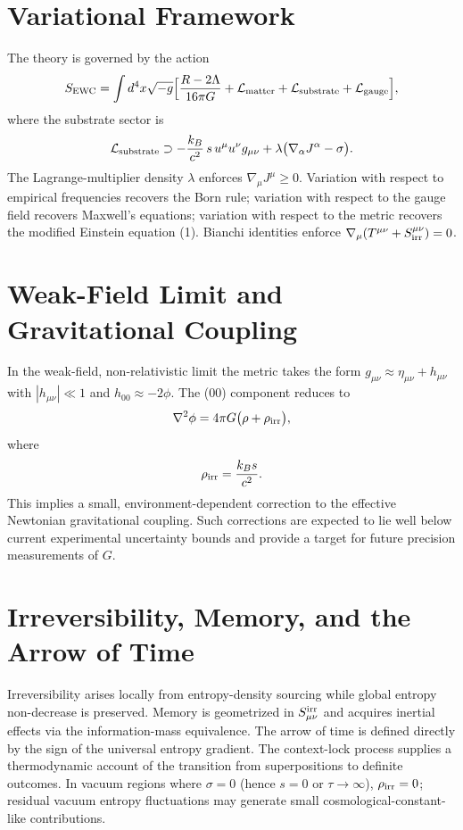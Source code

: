 \documentclass[11pt,letterpaper]{article}
\begin{document}
\section{Variational Framework}
The theory is governed by the action
\[
S_{\rm EWC} = \int d^4x \sqrt{-g} \Bigl[ \frac{R-2\Lambda}{16\pi G} + \mathcal{L}_{\rm matter} + \mathcal{L}_{\rm substrate} + \mathcal{L}_{\rm gauge} \Bigr],
\]
where the substrate sector is
\[
\mathcal{L}_{\rm substrate} \supset -\frac{k_B}{c^2} \, s \, u^\mu u^\nu g_{\mu\nu} + \lambda \bigl( \nabla_\alpha J^\alpha - \sigma \bigr).
\]
The Lagrange-multiplier density \(\lambda\) enforces \(\nabla_\mu J^\mu \geq 0\). Variation with respect to empirical frequencies recovers the Born rule; variation with respect to the gauge field recovers Maxwell’s equations; variation with respect to the metric recovers the modified Einstein equation (1). Bianchi identities enforce \(\nabla_\mu (T^{\mu\nu} + S_{\rm irr}^{\mu\nu}) = 0\).

\section{Weak-Field Limit and Gravitational Coupling}
In the weak-field, non-relativistic limit the metric takes the form \(g_{\mu\nu} \approx \eta_{\mu\nu} + h_{\mu\nu}\) with \(|h_{\mu\nu}| \ll 1\) and \(h_{00} \approx -2\phi\). The (00) component reduces to
\[
\nabla^2 \phi = 4\pi G \bigl( \rho + \rho_{\rm irr} \bigr),
\]
where
\[
\rho_{\rm irr} = \frac{k_B s}{c^2}.
\]
This implies a small, environment-dependent correction to the effective Newtonian gravitational coupling. Such corrections are expected to lie well below current experimental uncertainty bounds and provide a target for future precision measurements of \(G\).

\section{Irreversibility, Memory, and the Arrow of Time}
Irreversibility arises locally from entropy-density sourcing while global entropy non-decrease is preserved. Memory is geometrized in \(S_{\mu\nu}^{\rm irr}\) and acquires inertial effects via the information-mass equivalence. The arrow of time is defined directly by the sign of the universal entropy gradient. The context-lock process supplies a thermodynamic account of the transition from superpositions to definite outcomes. In vacuum regions where \(\sigma = 0\) (hence \(s = 0\) or \(\tau \to \infty\)), \(\rho_{\rm irr} = 0\); residual vacuum entropy fluctuations may generate small cosmological-constant-like contributions.
\end{document}
